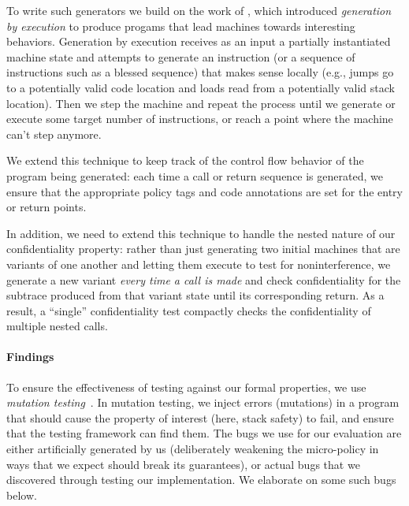 \documentclass[acmsmall,review,anonymous]{acmart}\settopmatter{printfolios=true,printccs=false,printacmref=false}
\begin{document}
{To write such generators we build on the work of
\citet{TestingNI:ICFP, DBLP:journals/jfp/HritcuLSADHPV16}, which
introduced {\em generation by execution} to produce progams that lead
machines towards interesting behaviors. Generation by
execution receives as an input a partially instantiated machine state
and attempts to generate an instruction (or a sequence of instructions
such as a blessed sequence) that makes sense locally (e.g., jumps go
to a potentially valid code location and loads read from a
potentially valid stack location). Then we step the machine and repeat
the process until we generate or execute some target number of
instructions, or reach a point where the machine can't step
anymore.

We extend this technique to keep track of the control flow behavior of
the program being generated: each time a call or return sequence is
generated, we ensure that the appropriate policy tags and code
annotations are set for the entry or return points.%

In addition, we need to extend this technique to handle the nested
nature of our confidentiality property: rather than just generating two
initial machines that are variants of one another and letting them
execute to test for noninterference, we generate a new variant
{\em every time a call is made} and check confidentiality for the
subtrace produced from that variant state until its corresponding
return. As a result, a ``single'' confidentiality test compactly
checks the confidentiality of multiple nested calls.

\paragraph*{Findings}

To ensure the effectiveness of testing against our formal properties, we
use {\em mutation testing}~\citep{JiaH11}. In mutation testing, we inject errors
(mutations) in a program that should cause the property of interest (here,
stack safety) to fail, and ensure that the testing framework can find
them. The bugs we use for our evaluation are either artificially generated
by us (deliberately weakening the micro-policy in ways that we expect
should break its guarantees), or actual bugs that we discovered through
testing our implementation. We elaborate on some such bugs below.

}
\end{document}
